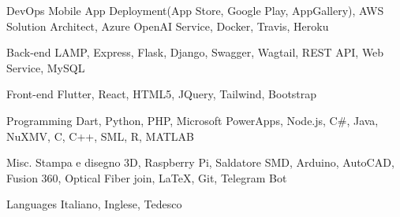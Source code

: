 

\begin{cvskills}

  \cvskill
    {DevOps} %
    {Mobile App Deployment(App Store, Google Play, AppGallery), AWS Solution Architect, Azure OpenAI Service, Docker, Travis, Heroku} %

  \cvskill
    {Back-end} %
    {LAMP, Express, Flask, Django, Swagger, Wagtail, REST API, Web Service, MySQL} %

  \cvskill
    {Front-end} %
    {Flutter, React, HTML5, JQuery, Tailwind, Bootstrap} %

  \cvskill
    {Programming} %
    {Dart, Python, PHP, Microsoft PowerApps, Node.js, C\#, Java, NuXMV, C, C++, SML, R, MATLAB} %

  \cvskill
  {Misc.} %
  {Stampa e disegno 3D, Raspberry Pi, Saldatore SMD, Arduino, AutoCAD, Fusion 360, Optical Fiber join, LaTeX, Git, Telegram Bot} %

  \cvskill
    {Languages} %
    {Italiano, Inglese, Tedesco} %

\end{cvskills}
